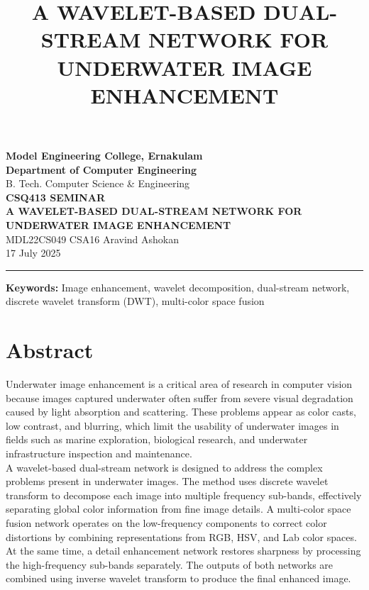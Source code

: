 \documentclass[a4paper,12pt]{article}
\title{\textbf{A WAVELET-BASED DUAL-STREAM NETWORK FOR UNDERWATER
IMAGE ENHANCEMENT}}
\begin{document}
\begin{center}
    \textbf{Model Engineering College, Ernakulam}\\
    \textbf{Department of Computer Engineering}\\
    B. Tech. Computer Science \& Engineering\\
    \textbf{CSQ413 SEMINAR}\\
    \vspace{0.5cm}
    \LARGE{\textbf{A WAVELET-BASED DUAL-STREAM NETWORK FOR UNDERWATER
IMAGE ENHANCEMENT }}\\
    \vspace{0.5cm}
    \large{MDL22CS049 CSA16 Aravind Ashokan}\\
    \large{17 July 2025}\\
    \vspace{0.5cm}
    \hrule 
    \vspace{0.5cm}
    \footnotesize{\textbf{Keywords: } Image enhancement, wavelet decomposition, dual-stream network, discrete wavelet transform (DWT), multi-color space fusion}
\end{center}

\section*{Abstract}
Underwater image enhancement is a critical area of research in computer vision because images captured underwater often suffer from severe visual degradation caused by light absorption and scattering. These problems appear as color casts, low contrast, and blurring, which limit the usability of underwater images in fields such as marine exploration, biological research, and underwater infrastructure inspection and maintenance.\\

A wavelet-based dual-stream network is designed to address the complex problems present in underwater images. The method uses discrete wavelet transform to decompose each image into multiple frequency sub-bands, effectively separating global color information from fine image details. A multi-color space fusion network operates on the low-frequency components to correct color distortions by combining representations from RGB, HSV, and Lab color spaces. At the same time, a detail enhancement network restores sharpness by processing the high-frequency sub-bands separately. The outputs of both networks are combined using inverse wavelet transform to produce the final enhanced image.\\
\end{document}
